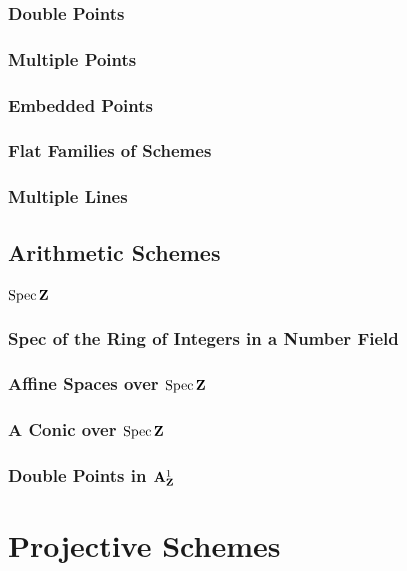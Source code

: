 \documentclass[oneside]{amsbook}
\numberwithin{ex}{chapter}
\begin{document}
\subsection{Double Points}

\subsection{Multiple Points}

\subsection{Embedded Points}

\subsection{Flat Families of Schemes}

\subsection{Multiple Lines}


\section{Arithmetic Schemes}
\subsection{$\operatorname{Spec}\mathbf{Z}$}

\subsection{Spec of the Ring of Integers in a Number Field}

\subsection{Affine Spaces over $\operatorname{Spec}\mathbf{Z}$}

\subsection{A Conic over $\operatorname{Spec}\mathbf{Z}$}

\subsection{Double Points in $\mathbf{A}_{\mathbf{Z}}^1$}


\chapter{Projective Schemes}
\end{document}
